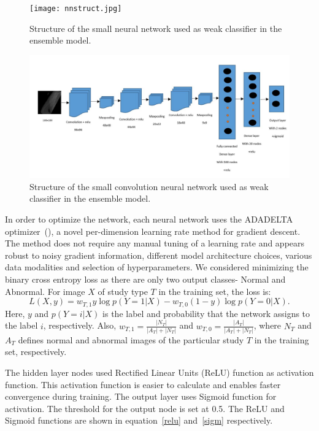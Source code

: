 \documentclass{article}
\begin{document}
\begin{figure}
    \centering
    \texttt{[image: nnstruct.jpg]}
    \caption{Structure of the small neural network used as weak classifier in the ensemble model.}
    \label{nn_struct}
\end{figure}
\begin{figure}
    \centering
    \includegraphics[width=1\linewidth]{rgbo1.JPG}
    \caption{Structure of the small convolution neural network used as weak classifier in the ensemble model.}
    \label{rgbo}
\end{figure}
In order to optimize the network, each neural network uses the ADADELTA optimizer~(\cite{adadelta}), a novel per-dimension learning rate method for gradient descent. The method does not require any  manual tuning of a learning rate and appears robust to noisy gradient information, different model architecture choices, various data modalities and selection of hyperparameters. We considered minimizing the binary cross entropy loss as there are only two output classes- Normal and Abnormal. For image $X$ of study type $T$ in the training set, the loss is:
\begin{equation}
    L(X,y) = w_{T,1}y \log{p(Y=1|X)} - w_{T,0}(1-y) \log{p(Y=0|X)}.
\end{equation}
Here, $y$ and $p(Y=i|X)$ is the label and probability that the network assigns to the label $i$, respectively. Also, $w_{T,1} = \frac{|N_T|}{|A_T|+|N_T|}$ and $w_{T,0} = \frac{|A_T|}{|A_T|+|N_T|}$, where $N_T$ and $A_T$ defines normal and abnormal images of the particular study $T$ in the training set, respectively.

The hidden layer nodes used Rectified Linear Units (ReLU) function as activation function. This activation function is easier to calculate and enables faster convergence during training. The output layer uses Sigmoid function for activation. The threshold for the output node is set at 0.5. The ReLU and Sigmoid functions are shown in equation~\ref{relu} and~\ref{sigm} respectively.
\end{document}
